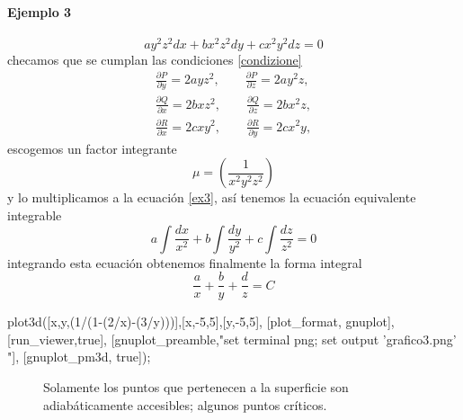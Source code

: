 \documentclass{article}
\theoremstyle{definition} \newtheorem{defi}{Definici\'on}
\theoremstyle{definition} \newtheorem{teo}{Teorema}
\theoremstyle{definition} \newtheorem{cor}{Corolario}
\begin{document}
\paragraph{Ejemplo 3}
\begin{equation}\label{ex3}
ay^2z^2dx+bx^2z^2dy+cx^2y^2dz=0
\end{equation}
checamos que se cumplan las condiciones \eqref{condizione}
\begin{align*}
\frac{\partial P}{\partial y} = 2ayz^2, \qquad \frac{\partial P}{\partial z} = 2ay^2z,\\
\frac{\partial Q}{\partial x} = 2bxz^2, \qquad \frac{\partial Q}{\partial z} = 2bx^2z,\\
\frac{\partial R}{\partial x} = 2cxy^2, \qquad \frac{\partial R}{\partial y} = 2cx^2y,
\end{align*}
escogemos un factor integrante 
\begin{equation*}
\mu=\left(\frac{1}{x^2y^2z^2}\right)
\end{equation*}
y lo multiplicamos a la ecuaci\'on \eqref{ex3}, as\'i tenemos la ecuaci\'on equivalente integrable
$$a\int \frac{dx}{x^2}+b\int \frac{dy}{y^2}+c\int \frac{dz}{z^2}=0$$
integrando esta ecuaci\'on obtenemos finalmente la forma integral
$$\frac{a}{x}+\frac{b}{y}+\frac{d}{z}=C$$
\begin{maximacmd}
   plot3d([x,y,(1/(1-(2/x)-(3/y)))],[x,-5,5],[y,-5,5],
    [plot_format, gnuplot],
    [run_viewer,true],
    [gnuplot_preamble,"set terminal png; set output 'grafico3.png' "],
    [gnuplot_pm3d, true]);
\end{maximacmd}
\begin{figure}
\caption{Solamente los puntos que pertenecen a la superficie son adiab\'aticamente accesibles; algunos puntos cr\'iticos.}
\end{figure}
\end{document}
